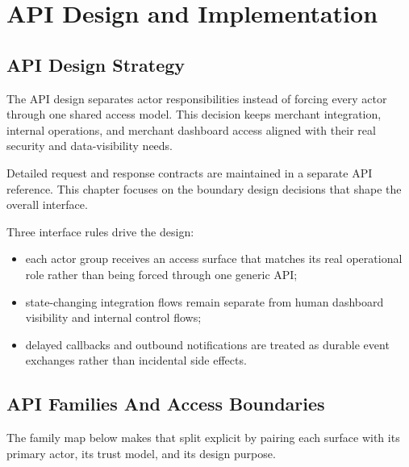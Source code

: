 \chapter{API Design and Implementation}

\section{API Design Strategy}

The API design separates actor responsibilities instead of forcing every actor
through one shared access model. This decision keeps merchant integration,
internal operations, and merchant dashboard access aligned with their real
security and data-visibility needs.

Detailed request and response contracts are maintained in a separate API
reference. This chapter focuses on the boundary design decisions that shape the
overall interface.

Three interface rules drive the design:

\begin{itemize}
  \item each actor group receives an access surface that matches its real
  operational role rather than being forced through one generic API;
  \item state-changing integration flows remain separate from human dashboard
  visibility and internal control flows;
  \item delayed callbacks and outbound notifications are treated as durable
  event exchanges rather than incidental side effects.
\end{itemize}

\section{API Families And Access Boundaries}

The family map below makes that split explicit by pairing each surface with its
primary actor, its trust model, and its design purpose.

